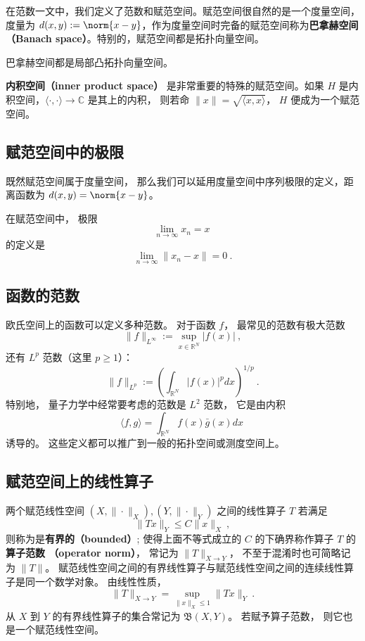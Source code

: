 
\begin{issues}
\issueDraft
\end{issues}


在范数一文中，我们定义了范数和赋范空间。赋范空间很自然的是一个度量空间，度量为 $d(x,y) := \norm{x-y}$，作为度量空间时完备的赋范空间称为\textbf{巴拿赫空间（Banach space）}。特别的，赋范空间都是拓扑向量空间。

\begin{theorem}{}
巴拿赫空间都是局部凸拓扑向量空间。
\end{theorem}

\textbf{内积空间（inner product space）} 是非常重要的特殊的赋范空间。如果 $H$ 是内积空间，$\langle\cdot,\cdot\rangle\to\mathbb C$ 是其上的内积， 则若命 $\|x\|=\sqrt{\langle x,x\rangle }$， $H$ 便成为一个赋范空间。

\subsection{赋范空间中的极限}
既然赋范空间属于度量空间， 那么我们可以延用度量空间中序列极限的定义，距离函数为 $d(x, y) = \norm{x - y}$。

在赋范空间中， 极限
\begin{equation}
\lim_{n\to\infty} x_n = x~
\end{equation}
的定义是
\begin{equation}
\lim_{n\to\infty} \|{x_n - x}\|= 0~.
\end{equation}


\subsection{函数的范数}
欧氏空间上的函数可以定义多种范数。 对于函数 $f$， 最常见的范数有极大范数
$$
\|f\|_{L^\infty}:=\sup_{x\in\mathbb{R}^N}|f(x)|~,
$$
还有 $L^p$ 范数（这里 $p\geq1$）：
$$
\|f\|_{L^p}:=\left(\int_{\mathbb{R}^N}|f(x)|^pdx\right)^{1/p}~.
$$
特别地， 量子力学中经常要考虑的范数是 $L^2$ 范数， 它是由内积
$$
\langle f,g\rangle=\int_{\mathbb{R}^N}f(x)\bar g(x)dx~
$$
诱导的。 这些定义都可以推广到一般的拓扑空间或测度空间上。

\subsection{赋范空间上的线性算子}
两个赋范线性空间 $(X,\|\cdot\|_X),(Y,\|\cdot\|_Y)$ 之间的线性算子 $T$ 若满足
$$
\|Tx\|_Y\leq C\|x\|_X~,
$$
则称为是\textbf{有界的（bounded）}; 使得上面不等式成立的 $C$ 的下确界称作算子 $T$ 的\textbf{算子范数 （operator norm）}， 常记为 $\|T\|_{X\to Y}$， 不至于混淆时也可简略记为 $\|T\|$。 赋范线性空间之间的有界线性算子与赋范线性空间之间的连续线性算子是同一个数学对象。 由线性性质，
$$
\|T\|_{X\to Y}=\sup_{\|x\|_X\leq 1}\|Tx\|_Y~.
$$
从 $X$ 到 $Y$ 的有界线性算子的集合常记为 $\mathfrak{B}(X,Y)$。 若赋予算子范数， 则它也是一个赋范线性空间。

